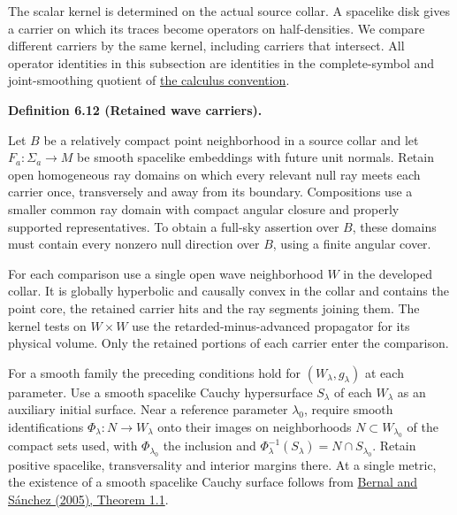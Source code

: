 \documentclass[
  english,
  11pt,
  reqno]{amsart}
\makeatletter
\newcommand{\pandocstatementheading}[1]{%
  \par\if@nobreak\else
    \addpenalty{\@beginparpenalty}%
    \addvspace{.5\baselineskip plus .2\baselineskip minus .2\baselineskip}%
  \fi
  {\normalfont\bfseries #1\par}%
  \nobreak\@afterindenttrue\@afterheading
}
\makeatother
\begin{document}
The scalar kernel is determined on the actual source collar. A spacelike
disk gives a carrier on which its traces become operators on
half-densities. We compare different carriers by the same kernel,
including carriers that intersect. All operator identities in this
subsection are identities in the complete-symbol and joint-smoothing
quotient of \hyperref[def:online-complete-symbol-calculus]{the calculus
convention}.

\pandocstatementheading{\leavevmode{}\label{def:online-wave-carrier-displays}Definition 6.12 (Retained wave carriers).}

Let \(B\) be a relatively compact point neighborhood in a source collar
and let \(F_a:\Sigma_a\to M\) be smooth spacelike embeddings with future
unit normals. Retain open homogeneous ray domains on which every
relevant null ray meets each carrier once, transversely and away from
its boundary. Compositions use a smaller common ray domain with compact
angular closure and properly supported representatives. To obtain a
full-sky assertion over \(B\), these domains must contain every nonzero
null direction over \(B\), using a finite angular cover.

For each comparison use a single open wave neighborhood \(W\) in the
developed collar. It is globally hyperbolic and causally convex in the
collar and contains the point core, the retained carrier hits and the
ray segments joining them. The kernel tests on \(W\times W\) use the
retarded-minus-advanced propagator for its physical volume. Only the
retained portions of each carrier enter the comparison.

For a smooth family the preceding conditions hold for
\((W_\lambda,g_\lambda)\) at each parameter. Use a smooth spacelike
Cauchy hypersurface \(S_\lambda\) of each \(W_\lambda\) as an auxiliary
initial surface. Near a reference parameter \(\lambda_0\), require
smooth identifications \(\Phi_\lambda:N\to W_\lambda\) onto their images
on neighborhoods \(N\subset W_{\lambda_0}\) of the compact sets used,
with \(\Phi_{\lambda_0}\) the inclusion and
\(\Phi_\lambda^{-1}(S_\lambda)=N\cap S_{\lambda_0}\). Retain positive
spacelike, transversality and interior margins there. At a single
metric, the existence of a smooth spacelike Cauchy surface follows from
\hyperref[ref-BernalSanchez2005]{Bernal and Sánchez (2005), Theorem
1.1}.
\end{document}
